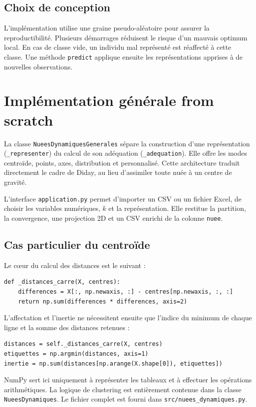 \documentclass[12pt,a4paper]{article}
\begin{document}
\subsection{Choix de conception}
L'implémentation utilise une graine pseudo-aléatoire pour assurer la
reproductibilité. Plusieurs démarrages réduisent le risque d'un mauvais optimum
local. En cas de classe vide, un individu mal représenté est réaffecté à cette
classe. Une méthode \texttt{predict} applique ensuite les représentations
apprises à de nouvelles observations.

\section{Implémentation générale from scratch}
La classe \texttt{NueesDynamiques\-Generales} sépare la construction d'une
représentation (\texttt{\_representer}) du calcul de son adéquation
(\texttt{\_adequation}). Elle offre les modes centroïde, points, axes,
distribution et personnalisé. Cette architecture traduit directement le cadre
de Diday, au lieu d'assimiler toute nuée à un centre de gravité.

L'interface \texttt{application.py} permet d'importer un CSV ou un fichier
Excel, de choisir les variables numériques, $k$ et la représentation. Elle
restitue la partition, la convergence, une projection 2D et un CSV enrichi de
la colonne \texttt{nuee}.

\subsection{Cas particulier du centroïde}
Le cœur du calcul des distances est le suivant :
\begin{lstlisting}
def _distances_carre(X, centres):
    differences = X[:, np.newaxis, :] - centres[np.newaxis, :, :]
    return np.sum(differences * differences, axis=2)
\end{lstlisting}
L'affectation et l'inertie ne nécessitent ensuite que l'indice du minimum de
chaque ligne et la somme des distances retenues :
\begin{lstlisting}
distances = self._distances_carre(X, centres)
etiquettes = np.argmin(distances, axis=1)
inertie = np.sum(distances[np.arange(X.shape[0]), etiquettes])
\end{lstlisting}
NumPy sert ici uniquement à représenter les tableaux et à effectuer les
opérations arithmétiques. La logique de clustering est entièrement contenue
dans la classe \texttt{NueesDynamiques}. Le fichier complet est fourni dans
\texttt{src/nuees\_dynamiques.py}.
\end{document}
